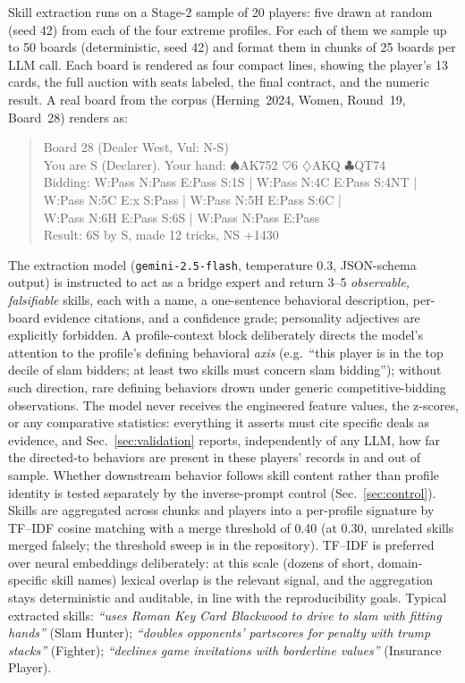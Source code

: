 \documentclass[11pt,a4paper]{article}
\begin{document}
Skill extraction runs on a Stage-2 sample of 20 players: five drawn at
random (seed 42) from each of the four extreme profiles. For each of
them we sample up to 50 boards (deterministic, seed 42) and format them
in chunks of 25 boards per LLM call. Each board
is rendered as four compact lines, showing the player's 13 cards, the full
auction with seats labeled, the final contract, and the numeric result.
A real board from the corpus (Herning~2024, Women, Round~19, Board~28)
renders as:

\begin{quote}\small\ttfamily
Board 28 (Dealer West, Vul: N-S)\\
You are S (Declarer). Your hand: $\spadesuit$AK752 $\heartsuit$6 $\diamondsuit$AKQ $\clubsuit$QT74\\
Bidding: W:Pass N:Pass E:Pass S:1S | W:Pass N:4C E:Pass S:4NT |\\
\hspace*{4.5em}W:Pass N:5C E:x S:Pass | W:Pass N:5H E:Pass S:6C |\\
\hspace*{4.5em}W:Pass N:6H E:Pass S:6S | W:Pass N:Pass E:Pass\\
Result: 6S by S, made 12 tricks, NS +1430
\end{quote}

The extraction model (\texttt{gemini-2.5-flash}, temperature 0.3,
JSON-schema output) is instructed to act as a bridge expert and return 3--5
\emph{observable, falsifiable} skills, each with a name, a one-sentence
behavioral description, per-board evidence citations, and a confidence
grade; personality adjectives are explicitly forbidden. A
profile-context block deliberately directs the model's attention to the
profile's defining behavioral \emph{axis} (e.g.\ ``this player is in
the top decile of slam bidders; at least two skills must concern slam
bidding''); without such direction, rare defining behaviors drown under
generic competitive-bidding observations. The model never receives the
engineered feature values, the z-scores, or any comparative statistics:
everything it asserts must cite specific deals as evidence, and
Sec.~\ref{sec:validation} reports, independently of any LLM, how far
the directed-to behaviors are present in these players' records in and
out of sample. Whether downstream behavior follows skill content rather than
profile identity is tested separately by the inverse-prompt control
(Sec.~\ref{sec:control}).
Skills are aggregated across chunks and players into a per-profile
signature by TF--IDF cosine matching with a merge threshold of 0.40
(at 0.30, unrelated skills merged falsely; the threshold sweep is in the
repository). TF--IDF is preferred over neural embeddings deliberately:
at this scale (dozens of short, domain-specific skill names) lexical
overlap is the relevant signal, and the aggregation stays deterministic
and auditable, in line with the reproducibility goals. Typical extracted skills: \emph{``uses Roman Key Card
Blackwood to drive to slam with fitting hands''} (Slam Hunter);
\emph{``doubles opponents' partscores for penalty with trump stacks''}
(Fighter); \emph{``declines game invitations with borderline values''}
(Insurance Player).
\end{document}
